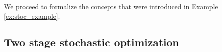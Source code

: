 \documentclass[sigconf, table]{acmart}
\begin{document}
\begin{example}











\end{example}

We proceed to formalize the concepts that were introduced in Example \ref{ex:stoc_example}.

\subsection{Two stage stochastic optimization}\label{sub:tsso}
\end{document}

